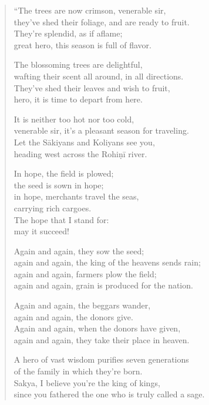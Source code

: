 \documentclass[12pt,openany]{book}%
\begin{document}
\begin{verse}%
“The trees are now crimson, venerable sir, \\
they’ve shed their foliage, and are ready to fruit. \\
They’re splendid, as if aflame; \\
great hero, this season is full of flavor. 

The blossoming trees are delightful, \\
wafting their scent all around, in all directions. \\
They’ve shed their leaves and wish to fruit, \\
hero, it is time to depart from here. 

It is neither too hot nor too cold, \\
venerable sir, it’s a pleasant season for traveling. \\
Let the \textsanskrit{Sākiyans} and Koliyans see you, \\
heading west across the \textsanskrit{Rohiṇī} river. 

In hope, the field is plowed; \\
the seed is sown in hope; \\
in hope, merchants travel the seas, \\
carrying rich cargoes. \\
The hope that I stand for: \\
may it succeed! 

Again and again, they sow the seed; \\
again and again, the king of the heavens sends rain; \\
again and again, farmers plow the field; \\
again and again, grain is produced for the nation. 

Again and again, the beggars wander, \\
again and again, the donors give. \\
Again and again, when the donors have given, \\
again and again, they take their place in heaven. 

A hero of vast wisdom purifies seven generations \\
of the family in which they’re born. \\
Sakya, I believe you’re the king of kings, \\
since you fathered the one who is truly called a sage. 


\end{verse}
\end{document}
